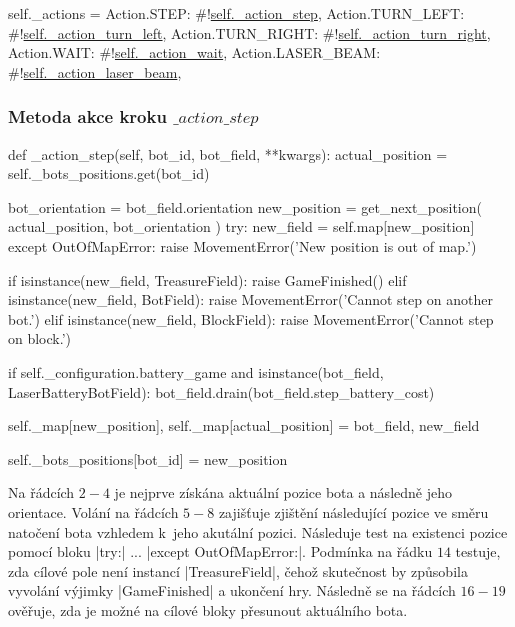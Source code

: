 \begin{code}[caption={Slovník akcí ve třídě $Game$},label={lst:game-actions},aboveskip=-10pt]
self._actions = {
    Action.STEP: #!\hyperref[subsubsec:method-action-step]{self.\_action\_step},
    Action.TURN_LEFT: #!\hyperref[subsubsec:method-action-turn-left]{self.\_action\_turn\_left},
    Action.TURN_RIGHT: #!\hyperref[subsubsec:method-action-turn-right]{self.\_action\_turn\_right},
    Action.WAIT: #!\hyperref[subsubsec:method-action-wait]{self.\_action\_wait},
    Action.LASER_BEAM: #!\hyperref[subsubsec:method-action-laser-beam]{self.\_action\_laser\_beam},
}	
\end{code}
{ %

\titlespacing*{\subsubsection}{0pt}{0.5ex}{-0.5ex}

\subsubsection{Metoda akce kroku $\_action\_step$}
\label{subsubsec:method-action-step}
\begin{code}[caption={Metoda $Game.\_action\_step$},label={lst:game-action-step}]
def _action_step(self, bot_id, bot_field, **kwargs):
    actual_position = self._bots_positions.get(bot_id)

    bot_orientation = bot_field.orientation
    new_position = get_next_position(
        actual_position,
        bot_orientation
    )
    try:
        new_field = self.map[new_position]
    except OutOfMapError:
        raise MovementError('New position is out of map.')

    if isinstance(new_field, TreasureField):
        raise GameFinished()
    elif isinstance(new_field, BotField):
        raise MovementError('Cannot step on another bot.')
    elif isinstance(new_field, BlockField):
        raise MovementError('Cannot step on block.')

    if self._configuration.battery_game and isinstance(bot_field, LaserBatteryBotField):
        bot_field.drain(bot_field.step_battery_cost)

    self._map[new_position], self._map[actual_position] = bot_field, new_field

    self._bots_positions[bot_id] = new_position
\end{code}

Na řádcích $2-4$ je nejprve získána aktuální pozice bota a následně jeho orientace. Volání na řádcích $5-8$ zajišťuje zjištění následující pozice ve směru natočení bota vzhledem k~jeho akutální pozici. Následuje test na existenci pozice pomocí bloku \ic|try:| $...$ \ic|except OutOfMapError:|. Podmínka na řádku $14$ testuje, zda cílové pole není instancí \ic|TreasureField|, čehož skutečnost by způsobila vyvolání výjimky \ic|GameFinished| a ukončení hry. Následně se na řádcích $16-19$ ověřuje, zda je možné na cílové bloky přesunout aktuálního bota.

}
